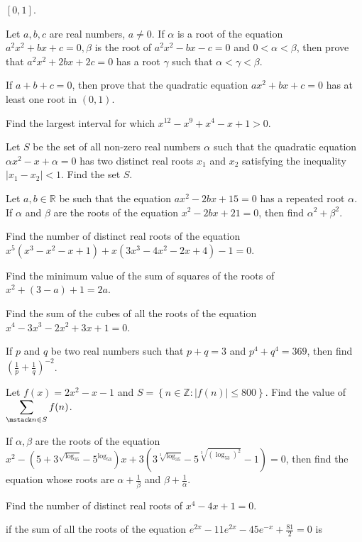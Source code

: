   $[0, 1]$.
\item Let $a, b, c$ are real numbers, $a\neq 0$. If $\alpha$ is a root of the equation $a^2x^2 + bx + c = 0,
  \beta$ is the root of $a^2x^2 - bx - c = 0$ and $0 < \alpha <\beta$, then prove that $a^2x^2 + 2bx + 2c =
  0$ has a root $\gamma$ such that $\alpha < \gamma < \beta$.
\item If $a + b + c = 0$, then prove that the quadratic equation $ax^2 + bx + c = 0$ has at least one root
  in $(0, 1)$.
\item Find the largest interval for which $x^{12} - x^{9} + x^4 - x + 1 > 0$.
\item Let $S$ be the set of all non-zero real numbers $\alpha$ such that the quadratic equation $\alpha x^2
  - x + \alpha = 0$ has two distinct real roots $x_1$ and $x_2$ satisfying the inequality $\left|x_1 -
  x_2\right| < 1$. Find the set $S$.
\item Let $a, b\in\mathbb{R}$ be such that the equation $ax^2 - 2bx + 15 = 0$ has a repeated root
  $\alpha$. If $\alpha$ and $\beta$ are the roots of the equation $x^2 -2bx + 21 = 0$, then find $\alpha^2 +
  \beta^2$.
\item Find the number of distinct real roots of the equation $x^5\left(x^3 - x^2 - x + 1\right) +
  x\left(3x^3 - 4x^2 - 2x + 4\right) - 1 = 0$.
\item Find the minimum value of the sum of squares of the roots of $x^2 + (3 - a) + 1 = 2a$.
\item Find the sum of the cubes of all the roots of the equation $x^4 - 3x^3 - 2x^2 + 3x + 1 = 0$.
\item If $p$ and $q$ be two real numbers such that $p + q = 3$ and $p^4 + q^4 = 369$, then find
  $\left(\frac{1}{p} + \frac{1}{q}\right)^{-2}$.
\item Let $f(x) = 2x^2 - x - 1$ and $S = \left\{n\in\mathbb{Z}: |f(n)| \leq 800\right\}$. Find the value of
  $\displaystyle\sum_{\mstack n\in S}f(n)$.
\item If $\alpha, \beta$ are the roots of the equation $x^2 - \left(5 + 3^{\sqrt{\log_35}} -
  5^{\log_53}\right)x + 3\left(3^{\sqrt[3]{\log_35}} - 5^{\sqrt[3]{\left(\log_53\right)^2}} - 1\right) = 0$,
  then find the equation whose roots are $\alpha + \frac{1}{\beta}$ and $\beta + \frac{1}{\alpha}$.
\item Find the number of distinct real roots of $x^4 - 4x + 1 = 0$.
\item if the sum of all the roots of the equation $e^{2x} - 11e^{2x} - 45e^{-x} + \frac{81}{2} = 0$ is
